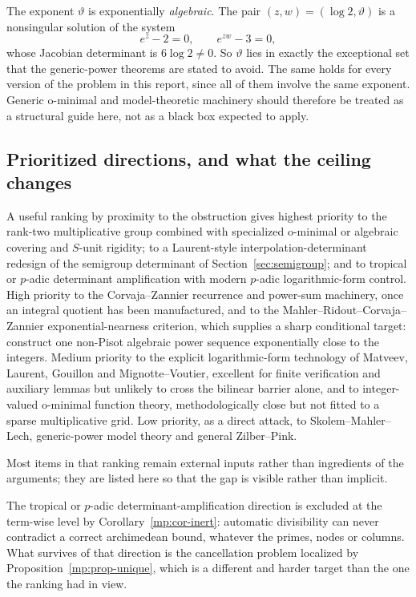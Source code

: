 \documentclass[11pt,oneside]{article}
\theoremstyle{definition}
\theoremstyle{remark}
\newcommand{\thetaq}{\vartheta}
\begin{document}
The exponent $\thetaq$ is exponentially \emph{algebraic}.  The pair
$(z,w)=(\log2,\thetaq)$ is a nonsingular solution of the system
\[
  e^{z}-2=0,\qquad e^{zw}-3=0,
\]
whose Jacobian determinant is $6\log2\ne0$.  So $\thetaq$ lies in exactly the exceptional set
that the generic-power theorems are stated to avoid.  The same holds for every version of the
problem in this report, since all of them involve the same exponent.  Generic o-minimal and
model-theoretic machinery should therefore be treated as a structural guide here, not as a
black box expected to apply.

\subsection{Prioritized directions, and what the ceiling changes}

A useful ranking by proximity to the obstruction gives highest priority to the rank-two
multiplicative group combined with specialized o-minimal or algebraic covering and $S$-unit
rigidity; to a Laurent-style
interpolation-determinant redesign of the semigroup determinant of
Section~\ref{sec:semigroup}; and to tropical or $p$-adic determinant amplification with modern
$p$-adic logarithmic-form control.  High priority to the Corvaja--Zannier recurrence and
power-sum machinery, once an integral quotient has been manufactured, and to the
Mahler--Ridout--Corvaja--Zannier exponential-nearness criterion, which supplies a sharp
conditional target: construct one non-Pisot algebraic power sequence exponentially close to the
integers.  Medium priority to the explicit logarithmic-form technology of Matveev, Laurent,
Gouillon and Mignotte--Voutier, excellent for finite verification and auxiliary lemmas but
unlikely to cross the bilinear barrier alone, and to integer-valued o-minimal function theory,
methodologically close but not fitted to a sparse multiplicative grid.  Low priority, as a
direct attack, to Skolem--Mahler--Lech, generic-power model theory and general Zilber--Pink.

Most items in that ranking remain external inputs rather than ingredients of the arguments;
they are listed here so that the gap is visible rather than implicit.

The tropical or $p$-adic determinant-amplification direction is excluded at the term-wise level by
Corollary~\ref{mp:cor-inert}: automatic divisibility can never contradict a correct archimedean
bound, whatever the primes, nodes or columns.  What survives of that direction is the
cancellation problem localized by Proposition~\ref{mp:prop-unique}, which is a different and
harder target than the one the ranking had in view.
\end{document}
